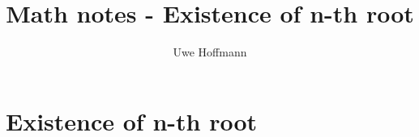 

\title{Math notes - Existence of n-th root}
\author{Uwe Hoffmann}



\setcounter{chapter}{1}
\chapter*{Existence of n-th root}
